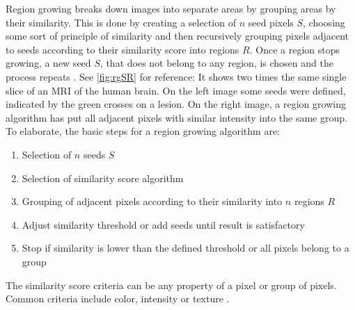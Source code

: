 \noindent
Region growing breaks down images into separate areas by grouping areas by their similarity.
This is done by creating a selection of $n$ seed pixels $S$, choosing some sort of principle of similarity
and then recursively grouping pixels adjacent to seeds according to their similarity score into regions $R$.
Once a region stops growing, a new seed $S$, that does not belong to any region, is chosen and the process repeats \cite{jourlinVariousContrastConcepts2016,palReviewImageSegmentation1993}.
See \cref{fig:rgSR} for reference: It shows two times the same single slice of an MRI of the human brain.
On the left image some seeds were defined, indicated by the green crosses on a lesion.
On the right image, a region growing algorithm has put all adjacent pixels with similar intensity into the same group.
To elaborate, the basic steps for a region growing algorithm are:
\begin{enumerate}
	\item Selection of $n$ seeds $S$
	\item Selection of similarity score algorithm
	\item Grouping of adjacent pixels according to their similarity into $n$ regions $R$
	\item Adjust similarity threshold or add seeds until result is satisfactory
	\item Stop if similarity is lower than the defined threshold or all pixels belong to a group
\end{enumerate}
\noindent
The similarity score criteria can be any property of a pixel or group of pixels.
Common criteria include color, intensity or texture \cite{jourlinVariousContrastConcepts2016,palReviewImageSegmentation1993}.
